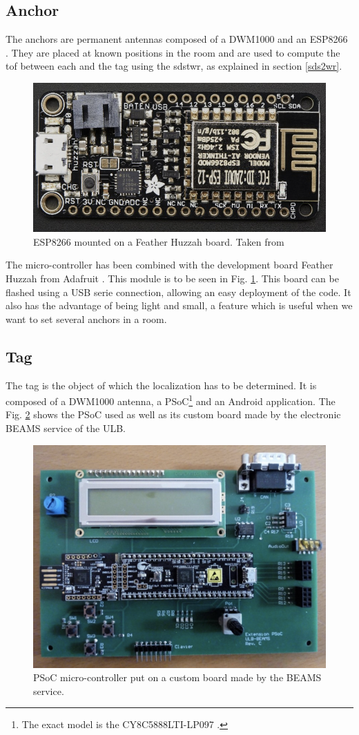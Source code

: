 \subsection{Anchor}

The anchors are permanent antennas composed of a DWM1000 and an ESP8266 \cite{esp8266}. They are placed at known positions in the room and are used to compute the \gls{tof} between each and the tag using the \gls{sdstwr}, as explained in section \ref{sds2wr}. 

\begin{figure}[H]
	\centering
	\includegraphics[width=.6\linewidth]{Images/esp8266.png}
	\caption{ESP8266 mounted on a Feather Huzzah board. Taken from \cite{adafruit}}
	\label{fig:esp8266}
\end{figure}

The micro-controller has been combined with the development board Feather Huzzah from Adafruit \cite{adafruit}. This module is to be seen in Fig. \ref{fig:esp8266}. This board can be flashed using a USB serie connection, allowing an easy deployment of the code. It also has the advantage of being light and small, a feature which is useful when we want to set several anchors in a room. 

\subsection{Tag}

The tag is the object of which the localization has to be determined. It is composed of a DWM1000 antenna, a PSoC\footnote{The exact model is the CY8C5888LTI-LP097 \cite{guyard2019navigation}.} and an Android application. The Fig. \ref{fig:psoc} shows the PSoC used as well as its custom board made by the electronic BEAMS service of the ULB.
\vspace{2mm}

\begin{figure}[H]
	\centering
	\includegraphics[width=.55\linewidth]{Images/psoc.png}
	\caption{PSoC micro-controller put on a custom board made by the BEAMS service.}
	\label{fig:psoc}
\end{figure}

